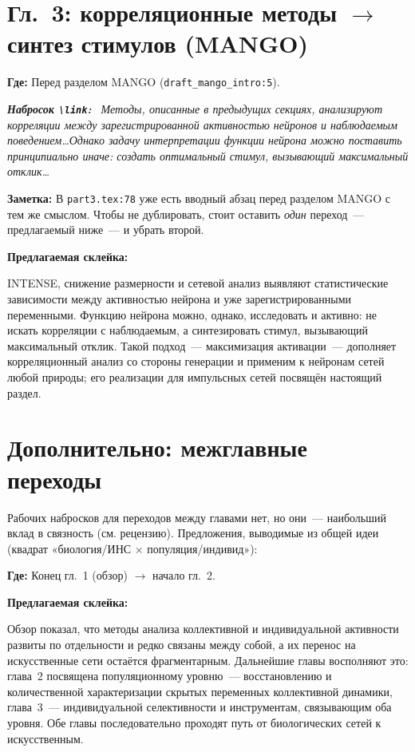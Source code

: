 \documentclass[12pt,a4paper]{article}
\newenvironment{sketch}{%
  \begin{mdframed}[backgroundcolor=black!4, linecolor=black!25, linewidth=0.4pt,
    innertopmargin=5pt, innerbottommargin=5pt]\small\itshape
  \textbf{\upshape Набросок \texttt{\textbackslash link}:}\ }{%
  \end{mdframed}}
\newenvironment{glue}{%
  \begin{mdframed}[backgroundcolor=green!5, linecolor=green!40!black, linewidth=0.6pt,
    innertopmargin=5pt, innerbottommargin=5pt]
  \textbf{Предлагаемая склейка:}\par\smallskip}{%
  \end{mdframed}}
\newcommand{\loc}[1]{\par\noindent\textcolor{blue!55!black}{\textbf{Где:} #1}\par}
\newcommand{\note}[1]{\par\noindent\textcolor{red!60!black}{\textbf{Заметка:} #1}\par}
\begin{document}
\section{Гл.~3: корреляционные методы $\to$ синтез стимулов (MANGO)}
\loc{Перед разделом MANGO (\texttt{draft\_mango\_intro:5}).}
\begin{sketch}
Методы, описанные в предыдущих секциях, анализируют корреляции между
зарегистрированной активностью нейронов и наблюдаемым поведением\ldots Однако
задачу интерпретации функции нейрона можно поставить принципиально иначе:
\textit{создать} оптимальный стимул, вызывающий максимальный отклик\ldots
\end{sketch}
\note{В \texttt{part3.tex:78} уже есть вводный абзац перед разделом MANGO с тем же
смыслом. Чтобы не дублировать, стоит оставить \emph{один} переход~--- предлагаемый
ниже~--- и убрать второй.}
\begin{glue}
INTENSE, снижение размерности и сетевой анализ выявляют статистические зависимости
между активностью нейрона и уже зарегистрированными переменными. Функцию нейрона
можно, однако, исследовать и активно: не искать корреляции с наблюдаемым, а
синтезировать стимул, вызывающий максимальный отклик. Такой подход~--- максимизация
активации~--- дополняет корреляционный анализ со стороны генерации и применим к
нейронам сетей любой природы; его реализации для импульсных сетей посвящён
настоящий раздел.
\end{glue}

\section*{Дополнительно: межглавные переходы}
Рабочих набросков для переходов между главами нет, но они~--- наибольший вклад
в связность (см. рецензию). Предложения, выводимые из общей идеи (квадрат
«биология/ИНС $\times$ популяция/индивид»):

\loc{Конец гл.~1 (обзор) $\to$ начало гл.~2.}
\begin{glue}
Обзор показал, что методы анализа коллективной и индивидуальной активности
развиты по отдельности и редко связаны между собой, а их перенос на искусственные
сети остаётся фрагментарным. Дальнейшие главы восполняют это: глава~2 посвящена
популяционному уровню~--- восстановлению и количественной характеризации скрытых
переменных коллективной динамики, глава~3~--- индивидуальной селективности и
инструментам, связывающим оба уровня. Обе главы последовательно проходят путь
от биологических сетей к искусственным.
\end{glue}
\end{document}
